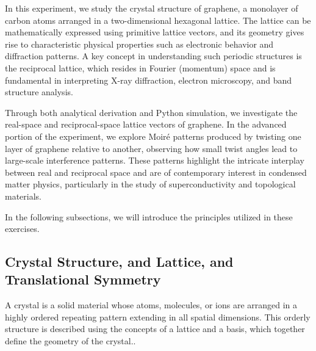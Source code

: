 \documentclass[12pt,a4paper]{article}
\begin{document}
\begin{CJK}{UTF8}{bkai}
In this experiment, we study the crystal structure of graphene, a monolayer of carbon atoms arranged in a two-dimensional hexagonal lattice. The lattice can be mathematically expressed using primitive lattice vectors, and its geometry gives rise to characteristic physical properties such as electronic behavior and diffraction patterns. A key concept in understanding such periodic structures is the reciprocal lattice, which resides in Fourier (momentum) space and is fundamental in interpreting X-ray diffraction, electron microscopy, and band structure analysis.

Through both analytical derivation and Python simulation, we investigate the real-space and reciprocal-space lattice vectors of graphene. In the advanced portion of the experiment, we explore Moiré patterns produced by twisting one layer of graphene relative to another, observing how small twist angles lead to large-scale interference patterns. These patterns highlight the intricate interplay between real and reciprocal space and are of contemporary interest in condensed matter physics, particularly in the study of superconductivity and topological materials.

In the following subsections, we will introduce the principles utilized in these exercises.

\subsection{Crystal Structure, and Lattice, and Translational Symmetry}
\hfill

A crystal is a solid material whose atoms, molecules, or ions are arranged in a highly ordered repeating pattern extending in all spatial dimensions. This orderly structure is described using the concepts of a lattice and a basis, which together define the geometry of the crystal..


\end{CJK}
\end{document}
